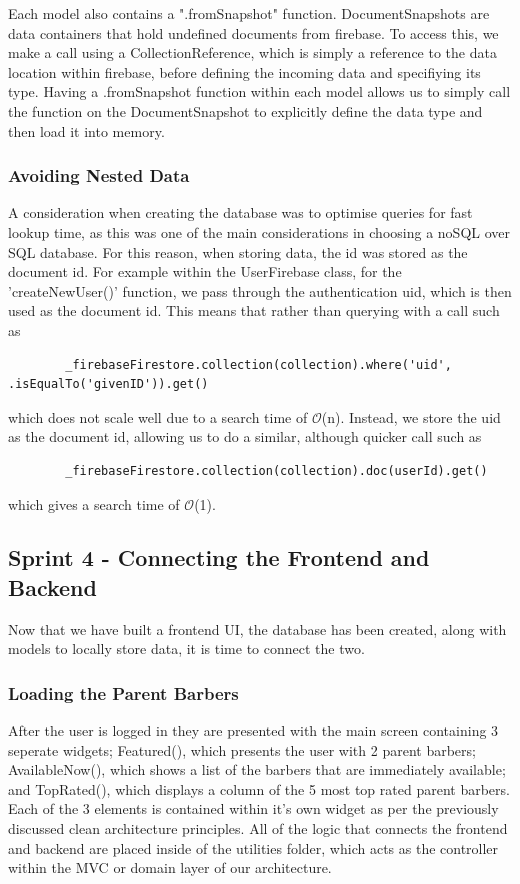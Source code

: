 \documentclass[12pt]{article}
\begin{document}
	Each model also contains a ".fromSnapshot" function. DocumentSnapshots are data containers that hold undefined documents from firebase. To access this, we make a call using a CollectionReference, which is simply a reference to the data location within firebase, before defining the incoming data and specifiying its type. Having a .fromSnapshot function within each model allows us to simply call the function on the DocumentSnapshot to explicitly define the data type and then load it into memory. 
	
	\subsubsection{Avoiding Nested Data}
	A consideration when creating the database was to optimise queries for fast lookup time, as this was one of the main considerations in choosing a noSQL over SQL database. For this reason, when storing data, the id was stored as the document id. For example within the UserFirebase class, for the 'createNewUser()' function, we pass through the authentication uid, which is then used as the document id. This means that rather than querying with a call such as 
	\begin{lstlisting}
		_firebaseFirestore.collection(collection).where('uid', .isEqualTo('givenID')).get()
	\end{lstlisting}
	which does not scale well due to a search time of $\mathcal{O}$(n). Instead, we store the uid as the document id, allowing us to do a similar, although quicker call such as
	\begin{lstlisting}
		_firebaseFirestore.collection(collection).doc(userId).get()
	\end{lstlisting}
	which gives a search time of $\mathcal{O}$(1).
	
	
	
	
	\subsection{Sprint 4 - Connecting the Frontend and Backend}
	Now that we have built a frontend UI, the database has been created, along with models to locally store data, it is time to connect the two.
	
	\subsubsection{Loading the Parent Barbers}
	After the user is logged in they are presented with the main screen containing 3 seperate widgets; Featured(), which presents the user with 2 parent barbers; AvailableNow(), which shows a list of the barbers that are immediately available; and TopRated(), which displays a column of the 5 most top rated parent barbers. Each of the 3 elements is contained within it's own widget as per the previously discussed clean architecture principles. All of the logic that connects the frontend and backend are placed inside of the utilities folder, which acts as the controller within the MVC or domain layer of our architecture. 
	
\end{document}
